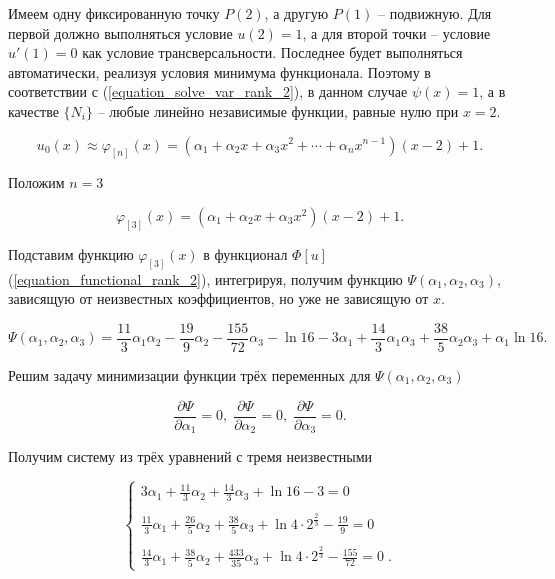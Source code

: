 Имеем одну фиксированную точку $P(2)$, а другую $P(1)$ -- подвижную. Для первой должно выполняться условие $u(2)=1$, а для второй точки -- условие $u'(1)=0$ как условие трансверсальности. Последнее будет выполняться автоматически, реализуя условия минимума функционала. Поэтому в соответствии с (\ref{equation_solve_var_rank_2}), в данном случае $\psi(x) = 1$, а в качестве $\lbrace N_{i} \rbrace$ -- любые линейно независимые функции, равные нулю при $x=2$.

\begin{displaymath}
	u_{0}(x) \approx \varphi_{[n]}(x) = (\alpha_{1} + \alpha_{2}x + \alpha_{3}x^2 + \cdots + \alpha_{n}x^{n-1})(x-2)+1.
\end{displaymath}

\noindent Положим $n = 3$

\begin{displaymath}
	\varphi_{[3]}(x) = (\alpha_{1} + \alpha_{2}x + \alpha_{3}x^2)(x-2)+1.
\end{displaymath}

\noindent Подставим функцию $\varphi_{[3]}(x)$ в функционал $\Phi[u]$ (\ref{equation_functional_rank_2}), интегрируя, получим функцию $\Psi(\alpha_{1}, \alpha_{2}, \alpha_{3})$, зависящую от неизвестных коэффициентов, но уже не зависящую от $x$.

\begin{displaymath}
	\Psi(\alpha_{1}, \alpha_{2}, \alpha_{3}) = \frac{11}{3}\alpha_{1}\alpha_{2} - \frac{19}{9}\alpha_{2} - \frac{155}{72}\alpha_{3} - \ln{16} - 3\alpha_{1} + \frac{14}{3}\alpha_{1}\alpha_{3} + \frac{38}{5}\alpha_{2}\alpha_{3} + \alpha_{1}\ln{16}.
\end{displaymath}

Решим задачу минимизации функции трёх переменных для $\Psi(\alpha_{1}, \alpha_{2}, \alpha_{3})$

\begin{displaymath}
	\frac{\partial \Psi}{\partial \alpha_{1}} = 0, \;
	\frac{\partial \Psi}{\partial \alpha_{2}} = 0, \;
	\frac{\partial \Psi}{\partial \alpha_{3}} = 0.
\end{displaymath}

\noindent Получим систему из трёх уравнений с тремя неизвестными

\begin{displaymath}
	\begin{cases}
		3\alpha_{1} + \frac{11}{3}\alpha_{2} + \frac{14}{3}\alpha_{3} + \ln{16} - 3 = 0 \\
		\\
		\frac{11}{3}\alpha_{1} + \frac{26}{5}\alpha_{2} + \frac{38}{5}\alpha_{3} + \ln{4 \cdot 2^{\frac{2}{3}}} - \frac{19}{9} = 0 \\
		\\
		\frac{14}{3}\alpha_{1} + \frac{38}{5}\alpha_{2} + \frac{433}{35}\alpha_{3} + \ln{4 \cdot 2^{\frac{2}{3}}} - \frac{155}{72} = 0 \; .
	\end{cases}
\end{displaymath}

